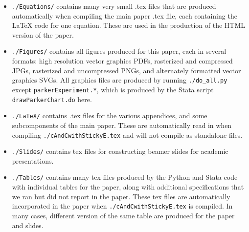 \documentclass[12pt,pdftex,letterpaper]{article}
\begin{document}
\begin{itemize}
\begin{itemize}
\end{itemize}

\item \texttt{./Equations/} contains many very small .tex files that are produced automatically when compiling the main paper .tex file, each containing the LaTeX code for one equation.  These are used in the production of the HTML version of the paper.

\item \texttt{./Figures/} contains all figures produced for this paper, each in several formats: high resolution vector graphics PDFs, rasterized and compressed JPGs, rasterized and uncompressed PNGs, and alternately formatted vector graphics SVGs.  All graphics files are produced by running \texttt{./do\_all.py} except \texttt{parkerExperiment.*}, which is produced by the Stata script \texttt{drawParkerChart.do} here.

\item \texttt{./LaTeX/} contains .tex files for the various appendices, and some subcomponents of the main paper.  These are automatically read in when compiling \texttt{./cAndCwithStickyE.tex} and will not compile as standalone files.

\item \texttt{./Slides/} contains tex files for constructing beamer slides for academic presentations.

\item \texttt{./Tables/} contains many tex files produced by the Python and Stata code with individual tables for the paper, along with additional specifications that we ran but did not report in the paper.  These tex files are automatically incorporated in the paper when \texttt{./cAndCwithStickyE.tex} is compiled.  In many cases, different version of the same table are produced for the paper and slides.

\end{itemize}
\end{document}
